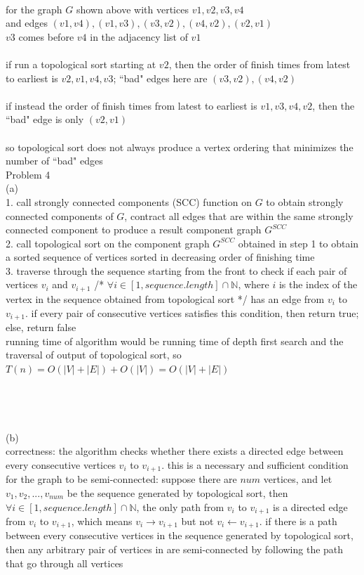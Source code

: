 \documentclass[12pt,border=4pt,multi]{article} %
\begin{document}
\\
for the graph $G$ shown above with vertices $v1, v2, v3, v4$\\
and edges $(v1, v4), (v1, v3), (v3, v2), (v4, v2), (v2, v1)$\\
$v3$ comes before $v4$ in the adjacency list of $v1$\\
\\
if run a topological sort starting at $v2$, then the order of finish times from latest to earliest is $v2, v1, v4, v3$; ``bad" edges here are $(v3, v2), (v4, v2)$\\
\\
if instead the order of finish times from latest to earliest is $v1, v3, v4, v2$, then the ``bad" edge is only $(v2, v1)$\\
\\
so topological sort does not always produce a vertex ordering that minimizes the number of ``bad" edges\\
\newpage 
\noindent
Problem 4\\
(a)\\
1. call strongly connected components (SCC) function on $G$ to obtain strongly connected components of $G$, contract all edges that are within the same strongly connected component to produce a result component graph $G^{SCC}$\\
2. call topological sort on the component graph $G^{SCC}$ obtained in step 1 to obtain a sorted sequence of vertices sorted in decreasing order of finishing time\\
3. traverse through the sequence starting from the front to check if each pair of vertices $v_i$ and $v_{i + 1}$ /* $\forall i \in [1, sequence.length] \cap \mathbb{N}$, where $i$ is the index of the vertex in the sequence obtained from topological sort */ has an edge from $v_i$ to $v_{i + 1}$. if every pair of consecutive vertices satisfies this condition, then return true; else, return false\\ 
running time of algorithm would be running time of depth first search and the traversal of output of topological sort, so $T(n) = O(|V| + |E|) + O(|V|) = O(|V| + |E|)$\\
\\
\\
\\
\\
(b)\\
correctness: the algorithm checks whether there exists a directed edge between every consecutive vertices $v_i$ to $v_{i + 1}$. this is a necessary and sufficient condition for the graph to be semi-connected: suppose there are $num$ vertices, and let $v_1, v_2, ..., v_{num}$ be the sequence generated by topological sort, then $\forall i \in [1, sequence.length] \cap \mathbb{N}$, the only path from $v_i$ to $v_{i + 1}$ is a directed edge from $v_i$ to $v_{i + 1}$, which means $v_i \rightarrow v_{i + 1}$ but not $v_i \leftarrow v_{i + 1}$. if there is a path between every consecutive vertices in the sequence generated by topological sort, then any arbitrary pair of vertices in are semi-connected by following the path that go through all vertices\\
\end{document}
